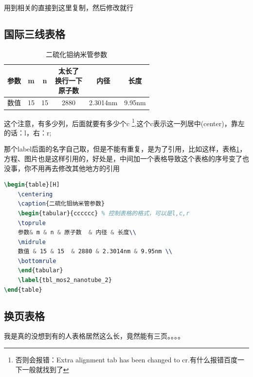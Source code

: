 \documentclass[AutoFakeBold]{LZUThesis2007}
\begin{document}
用到相关的直接到这里复制，然后修改就行

\subsection{国际三线表格} %
\label{sub:国际三线表格}

\begin{table}[H]
    \centering
    \caption{二硫化钼纳米管参数}
    \begin{tabular}{cccccc} %
    \toprule
    参数& m & n & \tabincell{c}{太长了\\换行一下\\原子数}  & 内径 & 长度\\
    \midrule
    数值 & 15 & 15  & 2880 & 2.3014nm & 9.95nm \\
    \bottomrule
    \end{tabular}
    \label{tbl_mos2_nanotube}
\end{table}

这个注意，有多少列，后面就要有多少个c \footnote{否则会报错：Extra alignment tab has been changed to cr.有什么报错百度一下一般就找到了},这个c表示这一列居中(center)，靠左的话：l，右：r;

那个label后面的名字自己取，但是不能有重复，是为了引用，比如这样，表格\ref{tbl_mos2_nanotube}，方程、图片也是这样引用的，好处是，中间加一个表格导致这个表格的序号变了也没事，你不用再去修改其他地方的引用

\begin{lstlisting}[language = tex]
\begin{table}[H]
    \centering
    \caption{二硫化钼纳米管参数}
    \begin{tabular}{cccccc} % 控制表格的格式，可以是l,c,r
    \toprule
    参数& m & n & 原子数  & 内径 & 长度\\
    \midrule
    数值 & 15 & 15  & 2880 & 2.3014nm & 9.95nm \\
    \bottomrule
    \end{tabular}
    \label{tbl_mos2_nanotube_2}
\end{table}
\end{lstlisting}

\subsection{换页表格} %

我是真的没想到有的人表格居然这么长，竟然能有三页。。。。
\end{document}

